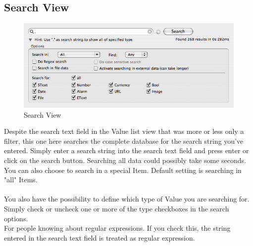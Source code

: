 \documentclass[12pt,a4]{article}
\begin{document}
\subsection{Search View}
\label{gui_search}
\medskip
% 
\begin{figure}[ht]
\begin{center}
\includegraphics[width=13.5cm]{images/Search_View.png}
\end{center}
\caption{Search View}
\label{image:searchview}
\end{figure}
\noindent
%
Despite the search text field in the Value list view that was more or less only a filter, this one here searches the complete database for the search string you've entered. Simply enter a search string into the search text field and press enter or click on the search button. Searching all data could possibly take some seconds. \\
You can also choose to search in a special Item. Default setting is searching in "all" Items. \\
\\
You also have the possibility to define which type of Value you are searching for. Simply check or uncheck one or more of the type checkboxes in the search options. \\
For people knowing about regular expressions. If you check this, the string entered in the search text field is treated as regular expression.
\end{document}
